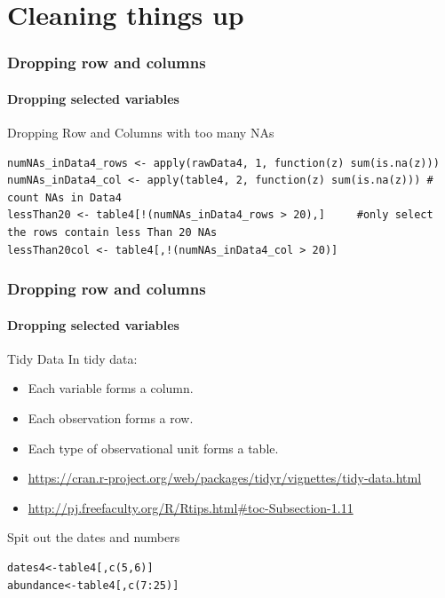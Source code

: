 \documentclass[12pt]{beamer}\usepackage[]{graphicx}\usepackage[]{color}
\begin{document}
\section*{Cleaning things up}
\begin{frame}[fragile]
  \frametitle{Dropping row and columns}
  \framesubtitle{Dropping selected variables}
  \begin{block}{Dropping Row and Columns with too many NAs}  
  \end{block}
\begin{lstlisting}
numNAs_inData4_rows <- apply(rawData4, 1, function(z) sum(is.na(z))) 
numNAs_inData4_col <- apply(table4, 2, function(z) sum(is.na(z))) # count NAs in Data4
lessThan20 <- table4[!(numNAs_inData4_rows > 20),]	   #only select the rows contain less Than 20 NAs
lessThan20col <- table4[,!(numNAs_inData4_col > 20)]
\end{lstlisting}
\end{frame}

\begin{frame}[fragile]
  \frametitle{Dropping row and columns}
  \framesubtitle{Dropping selected variables}

\begin{block}{Tidy Data}
In tidy data:
\begin{itemize}
\item Each variable forms a column.
\item Each observation forms a row.
\item Each type of observational unit forms a table.
\item \url{https://cran.r-project.org/web/packages/tidyr/vignettes/tidy-data.html}
\item \url{http://pj.freefaculty.org/R/Rtips.html#toc-Subsection-1.11}
\end{itemize}
\end{block}
 

\begin{block}{Spit out the dates and numbers}
\end{block}
\begin{lstlisting}
dates4<-table4[,c(5,6)]
abundance<-table4[,c(7:25)]
\end{lstlisting}
\end{frame}
\end{document}
